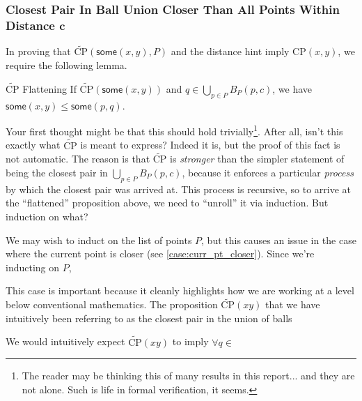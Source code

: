 \documentclass{article}
\begin{document}


\subsubsection{Closest Pair In Ball Union Closer Than All Points Within Distance $\mathbf{c}$}
In proving that $\widetilde{\text{CP}}(\mathsf{some}(x, y), P)$ and the distance hint imply $\text{CP}(x, y)$, we require the following lemma.
\begin{tcblemma}{$\widetilde{\text{CP}}$ Flattening}{}
  If $\widetilde{\text{CP}}(\mathsf{some}(x, y))$ and $q \in \bigcup_{p \in P} B_P(p, c)$, we have $\mathsf{some}(x, y) \leq \mathsf{some}(p, q)$.
\end{tcblemma}
Your first thought might be that this should hold trivially\footnote{
  The reader may be thinking this of many results in this report... and they are not alone.
  Such is life in formal verification, it seems.
}.
After all, isn't this exactly what $\widetilde{\text{CP}}$ is meant to express?
Indeed it is, but the proof of this fact is not automatic.
The reason is that $\widetilde{\text{CP}}$ is \textit{stronger} than the simpler statement of being the closest pair in $\bigcup_{p \in P} B_P(p, c)$, because it enforces a particular \textit{process} by which the closest pair was arrived at.
This process is recursive, so to arrive at the ``flattened'' proposition above, we need to ``unroll'' it via induction.
But induction on what?

We may wish to induct on the list of points $P$, but this causes an issue in the case where the current point is closer (see \ref{case:curr_pt_closer}).
Since we're inducting on $P$,

This case is important because it cleanly highlights how we are working at a level below conventional mathematics.
The proposition $\widetilde{\text{CP}}(x\!y)$ that we have intuitively been referring to as the closest pair in the union of balls

We would intuitively expect $\widetilde{\text{CP}}(x\!y)$ to imply $\forall q \in $
\end{document}
